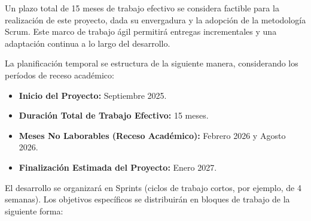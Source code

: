 Un plazo total de 15 meses de trabajo efectivo se considera factible para la realización de este proyecto, dada su envergadura y la adopción de la metodología Scrum. Este marco de trabajo ágil permitirá entregas incrementales y una adaptación continua a lo largo del desarrollo.

La planificación temporal se estructura de la siguiente manera, considerando los períodos de receso académico:
\begin{itemize}
    \item \textbf{Inicio del Proyecto:} Septiembre 2025.
    \item \textbf{Duración Total de Trabajo Efectivo:} 15 meses.
    \item \textbf{Meses No Laborables (Receso Académico):} Febrero 2026 y Agosto 2026.
    \item \textbf{Finalización Estimada del Proyecto:} Enero 2027.
\end{itemize}

El desarrollo se organizará en Sprints (ciclos de trabajo cortos, por ejemplo, de 4 semanas). Los objetivos específicos se distribuirán en bloques de trabajo de la siguiente forma:

